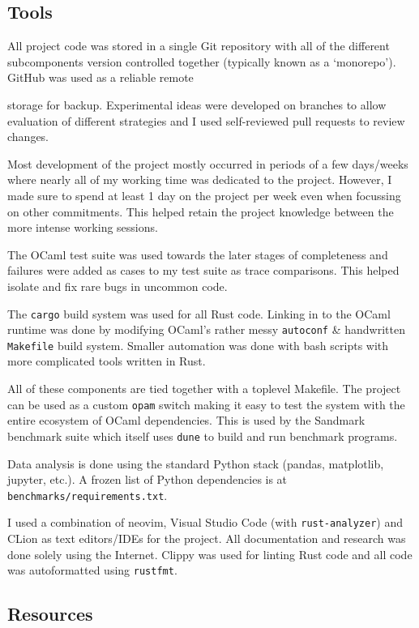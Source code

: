 \subsection{Tools}

All project code was stored in a single Git repository with all of the different subcomponents
version controlled together (typically known as a `monorepo'). GitHub was used as a reliable remote

storage for backup. Experimental ideas were developed on branches to allow evaluation of different
strategies and I used self-reviewed pull requests to review changes.

Most development of the project mostly occurred in periods of a few days/weeks where nearly
all of my working time was dedicated to the project. However, I made sure to spend at least 1 day
on the project per week even when focussing on other commitments. This helped retain the project
knowledge between the more intense working sessions.

The OCaml test suite was used towards the later stages of completeness and failures were added as
cases to my test suite as trace comparisons. This helped isolate and fix rare bugs in uncommon
code.

The \texttt{cargo} build system was used for all Rust code. Linking in to the OCaml runtime
was done by modifying OCaml's rather messy \texttt{autoconf} \& handwritten \texttt{Makefile} build
system. Smaller automation was done with bash scripts with more complicated tools written in Rust.

All of these components are tied together with a toplevel Makefile. The project can be used as a
custom
\texttt{opam} switch making it easy to test the system with the entire ecosystem of OCaml
dependencies.
This is used by the Sandmark benchmark suite which itself uses \texttt{dune} to build and run
benchmark programs.

Data analysis is done using the standard Python stack (pandas, matplotlib, jupyter, etc.). A frozen
list of Python dependencies is at \texttt{benchmarks/requirements.txt}.

I used a combination of neovim, Visual Studio Code (with \texttt{rust-analyzer}) and CLion as text
editors/IDEs for the project. All documentation and research was done solely using the Internet.
Clippy was used for linting Rust code and all code was autoformatted using \texttt{rustfmt}.

\subsection{Resources}

